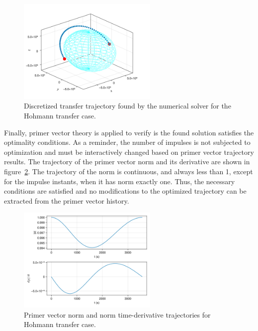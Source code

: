 \begin{figure}[htbp]
    \centering
    \includegraphics[width=0.6\textwidth]{img/hohmann_solved.png}
    \caption{Discretized transfer trajectory found by the numerical solver for the Hohmann transfer case.}
    \label{fig:hohmann_traj}
\end{figure}

Finally, primer vector theory is applied to verify is the found solution satisfies the optimality conditions. As a reminder, the number of impulses is not subjected to optimization and must be interactively changed based on primer vector trajectory results. The trajectory of the primer vector norm and its derivative are shown in figure~\ref{fig:hohmann_primer_vec}. The trajectory of the norm is continuous, and always less than 1, except for the impulse instants, when it has norm exactly one. Thus, the necessary conditions are satisfied and no modifications to the optimized trajectory can be extracted from the primer vector history.

\begin{figure}[htbp]
    \centering
    \includegraphics[width=0.6\textwidth]{img/hohmann_primer_vector_history.png}
    \caption{Primer vector norm and norm time-derivative trajectories for Hohmann transfer case.}
    \label{fig:hohmann_primer_vec}
\end{figure}

